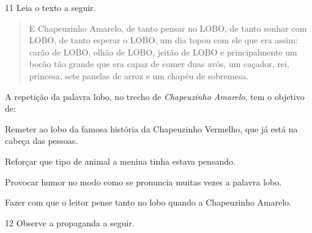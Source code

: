 \num{11} Leia o texto a seguir.

\begin{quote}
\noindent E Chapeuzinho Amarelo, de tanto pensar no LOBO, de tanto sonhar com
LOBO, de tanto esperar o LOBO, um dia topou com ele que era assim: carão
de LOBO, olhão de LOBO, jeitão de LOBO e principalmente um bocão tão
grande que era capaz de comer duas avós, um caçador, rei, princesa, sete
panelas de arroz e um chapéu de sobremesa.

\end{quote}

\noindent A repetição da palavra lobo, no trecho de \emph{Chapeuzinho Amarelo}, tem o
objetivo de:

\begin{escolha}
\item Remeter ao lobo da famosa história da Chapeuzinho Vermelho, que já
está na cabeça das pessoas.
\item Reforçar que tipo de animal a menina tinha estava pensando.
\item Provocar humor no modo como se pronuncia muitas vezes a palavra lobo.
\item Fazer com que o leitor pense tanto no lobo quando a Chapeuzinho
Amarelo.
\end{escolha}



\num{12} Observe a propaganda a seguir.

